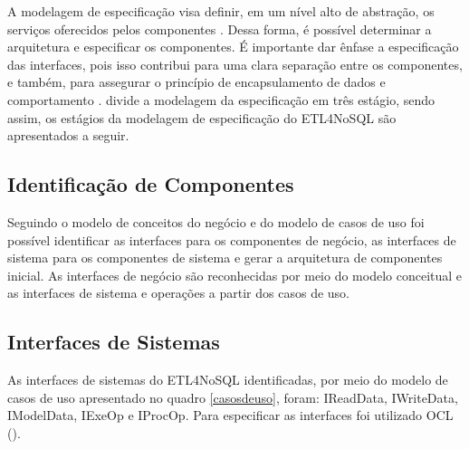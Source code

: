 A modelagem de especificação visa definir, em um nível alto de abstração, os serviços oferecidos pelos componentes \cite{itana:2005}. Dessa forma, é possível determinar a arquitetura e especificar os componentes. É importante dar ênfase a especificação das interfaces, pois isso contribui para uma clara separação entre os componentes, e também, para assegurar o princípio de encapsulamento de dados e comportamento \cite{itana:2005}. \cite{cheesman:2001} divide a modelagem da especificação em três estágio, sendo assim, os estágios da modelagem de especificação do ETL4NoSQL são apresentados a seguir.


\subsection{Identificação de Componentes}
Seguindo o modelo de conceitos do negócio e do modelo de casos de uso foi possível identificar as interfaces para os componentes de negócio, as interfaces de sistema para os componentes de sistema e gerar a arquitetura de componentes inicial. As interfaces de negócio são reconhecidas por meio do modelo conceitual e as interfaces de sistema e operações a partir dos casos de uso.

\subsection{Interfaces de Sistemas}

As interfaces de sistemas do ETL4NoSQL identificadas, por meio do modelo de casos de uso apresentado no quadro \ref{casosdeuso}, foram: IReadData, IWriteData, IModelData, IExeOp e IProcOp. Para especificar as interfaces foi utilizado OCL (\cite{warmer:1998}).



